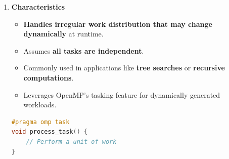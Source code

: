 \begin{enumerate}
    \item {}
    \begin{flushleft}
        \textcolor{Green3}{ \textbf{Characteristics}}
    \end{flushleft}
    \begin{itemize}
        \item \textbf{Handles irregular work distribution that may change dynamically} at runtime.
        \item Assumes \textbf{all tasks are independent}.
        \item Commonly used in applications like \textbf{tree searches} or \textbf{recursive computations}.
        \item Leverages OpenMP's tasking feature for dynamically generated workloads.
    \end{itemize}
    \begin{examplebox}
        \begin{lstlisting}[language=c++]
#pragma omp task
void process_task() {
    // Perform a unit of work
}\end{lstlisting}
    \end{examplebox}


\end{enumerate}
